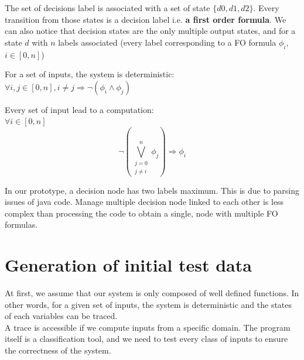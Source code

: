 \documentclass[a4paper]{report}
\begin{document}
\begin{NB}
The set of decisions label is associated with a set of state $\{d0, d1, d2\}$. Every transition from those states is a decision label i.e. \textbf{a first order formula}. We can also notice that decision states are the only multiple output states, and for a state $d$ with $n$ labels associated (every label corresponding to a FO formula $\phi_i$, $i\in[0, n]$)\\
\newline

\begin{lemma}
For a set of inputs, the system is deterministic:\\
$\forall i, j \in [0, n], i \neq j \Rightarrow \neg (\phi_i \wedge \phi_j)$\\
\end{lemma}

\begin{lemma}
Every set of input lead to a computation:\\
$\forall i \in [0, n] $\\
\[\displaystyle \neg (\bigvee_{\substack{j=0 \\ j \neq i}}^{n} \phi_j) \Rightarrow \phi_i \]
\end{lemma}

\end{NB}


\begin{remark}
In our prototype, a decision node has two labels maximum. This is due to parsing issues of java code. Manage multiple decision node linked to each other is less complex than processing the code to obtain a single, node with multiple FO formulas.
\end{remark}


\section*{Generation of initial test data}
At first, we assume that our system is only composed of well defined functions. In other words, for a given set of inputs, the system is deterministic and the states of each variables can be traced.\\

A trace is accessible if we compute inputs from a specific domain. The program itself is a classification tool, and we need to test every class of inputs to ensure the correctness of the system.\\
\end{document}
